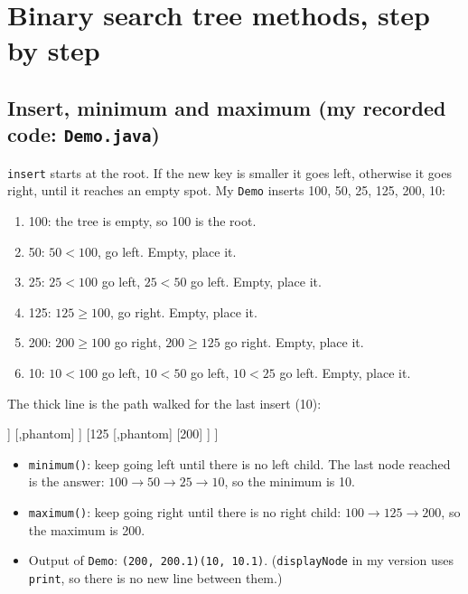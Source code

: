\documentclass[11pt]{article}
\begin{document}
	\section{Binary search tree methods, step by step}
	
	\subsection{Insert, minimum and maximum (my recorded code: \texttt{Demo.java})}
	\texttt{insert} starts at the root. If the new key is smaller it goes left, otherwise it goes right, until it reaches an empty spot. My \texttt{Demo} inserts 100, 50, 25, 125, 200, 10:
	\begin{enumerate}
		\item 100: the tree is empty, so 100 is the root.
		\item 50: $50<100$, go left. Empty, place it.
		\item 25: $25<100$ go left, $25<50$ go left. Empty, place it.
		\item 125: $125\ge 100$, go right. Empty, place it.
		\item 200: $200\ge 100$ go right, $200\ge 125$ go right. Empty, place it.
		\item 10: $10<100$ go left, $10<50$ go left, $10<25$ go left. Empty, place it.
	\end{enumerate}
	The thick line is the path walked for the last insert (10):
	\begin{center}
		\begin{forest}
			[100
			[50, onpath
			[25, onpath
			[10, onpath]
			[,phantom]
			]
			[,phantom]
			]
			[125
			[,phantom]
			[200]
			]
			]
		\end{forest}
	\end{center}
	\begin{itemize}
		\item \texttt{minimum()}: keep going left until there is no left child. The last node reached is the answer: $100 \to 50 \to 25 \to 10$, so the minimum is 10.
		\item \texttt{maximum()}: keep going right until there is no right child: $100 \to 125 \to 200$, so the maximum is 200.
		\item Output of \texttt{Demo}: \texttt{(200, 200.1)(10, 10.1)}. (\texttt{displayNode} in my version uses \texttt{print}, so there is no new line between them.)
	\end{itemize}
	
\end{document}
